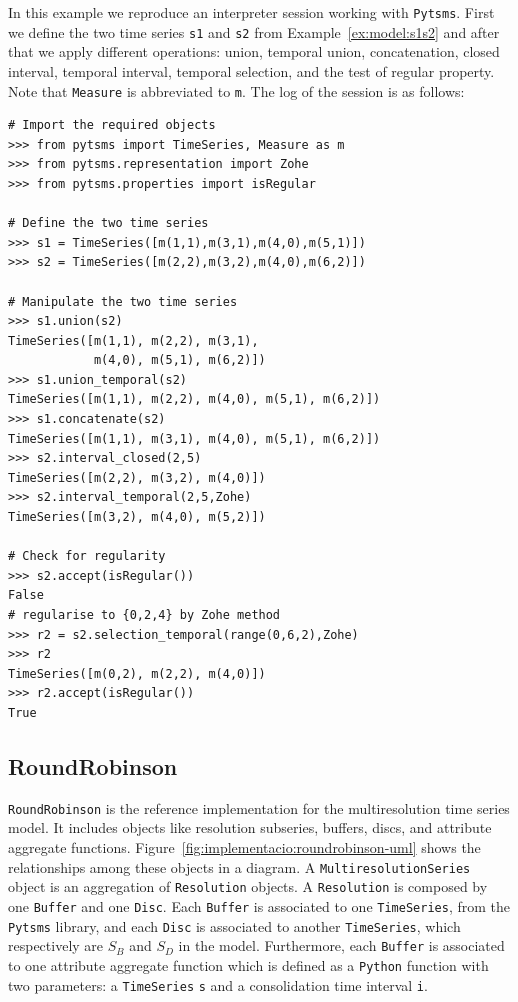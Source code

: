 \begin{example}
  \label{ex:pytsms:example}
  In this example we reproduce an interpreter session working with
  \texttt{Pytsms}. First we define the two time series \texttt{s1} and
  \texttt{s2} from Example~\ref{ex:model:s1s2} and after that we apply
  different operations: union, temporal union, concatenation, closed
  interval, \zohe{} temporal interval, \zohe{} temporal selection, and
  the test of regular property. Note that \texttt{Measure} is
  abbreviated to \texttt{m}. The log of the session is as follows:

  {\small
\begin{verbatim}
# Import the required objects
>>> from pytsms import TimeSeries, Measure as m
>>> from pytsms.representation import Zohe
>>> from pytsms.properties import isRegular

# Define the two time series
>>> s1 = TimeSeries([m(1,1),m(3,1),m(4,0),m(5,1)])
>>> s2 = TimeSeries([m(2,2),m(3,2),m(4,0),m(6,2)])

# Manipulate the two time series
>>> s1.union(s2)
TimeSeries([m(1,1), m(2,2), m(3,1), 
            m(4,0), m(5,1), m(6,2)])
>>> s1.union_temporal(s2)
TimeSeries([m(1,1), m(2,2), m(4,0), m(5,1), m(6,2)])
>>> s1.concatenate(s2) 
TimeSeries([m(1,1), m(3,1), m(4,0), m(5,1), m(6,2)])
>>> s2.interval_closed(2,5)
TimeSeries([m(2,2), m(3,2), m(4,0)])
>>> s2.interval_temporal(2,5,Zohe)
TimeSeries([m(3,2), m(4,0), m(5,2)])

# Check for regularity
>>> s2.accept(isRegular())
False
# regularise to {0,2,4} by Zohe method
>>> r2 = s2.selection_temporal(range(0,6,2),Zohe)
>>> r2
TimeSeries([m(0,2), m(2,2), m(4,0)])
>>> r2.accept(isRegular())
True
\end{verbatim}
}
\end{example}





\subsection{RoundRobinson}

\texttt{RoundRobinson} is the reference implementation for the
multiresolution time series model. It includes objects like
resolution subseries, buffers, discs, and attribute aggregate
functions. Figure~\ref{fig:implementacio:roundrobinson-uml} shows the
relationships among these objects in a  diagram. 
%
A \texttt{MultiresolutionSeries} object is an aggregation of
\texttt{Resolution} objects. A \texttt{Resolution} is composed by one
\texttt{Buffer} and one \texttt{Disc}. Each \texttt{Buffer} is
associated to one \texttt{TimeSeries}, from the \texttt{Pytsms}
library, and each \texttt{Disc} is associated to another
\texttt{TimeSeries}, which respectively are $S_B$ and $S_D$ in the
 model. Furthermore, each \texttt{Buffer} is associated to
one attribute aggregate function which is defined as
a \texttt{Python} function with two parameters: a \texttt{TimeSeries}
\texttt{s} and a consolidation time interval \texttt{i}.

